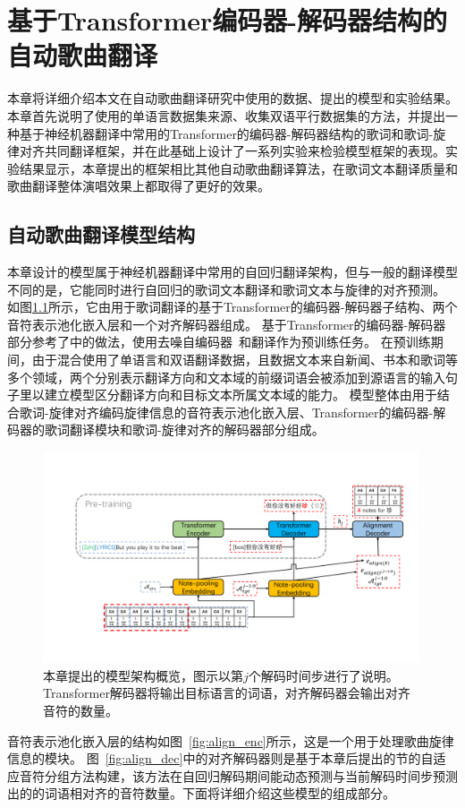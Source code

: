 \newcommand{\modelname}{LTAG}
\chapter{基于Transformer编码器-解码器结构的自动歌曲翻译}
\label{sec:ast}
本章将详细介绍本文在自动歌曲翻译研究中使用的数据、提出的模型和实验结果。本章首先说明了使用的单语言数据集来源、收集双语平行数据集的方法，并提出一种基于神经机器翻译中常用的Transformer的编码器-解码器结构的歌词和歌词-旋律对齐共同翻译框架，并在此基础上设计了一系列实验来检验模型框架的表现。实验结果显示，本章提出的框架相比其他自动歌曲翻译算法，在歌词文本翻译质量和歌曲翻译整体演唱效果上都取得了更好的效果。
\section{自动歌曲翻译模型结构}
本章设计的模型属于神经机器翻译中常用的自回归翻译架构，但与一般的翻译模型不同的是，它能同时进行自回归的歌词文本翻译和歌词文本与旋律的对齐预测。
如图\ref{fig:model}所示，它由用于歌词翻译的基于Transformer的编码器-解码器子结构、两个音符表示池化嵌入层和一个对齐解码器组成。
基于Transformer的编码器-解码器部分参考了\citet{gagast}中的做法，使用去噪自编码器~\citep{bart}和翻译作为预训练任务。
在预训练期间，由于混合使用了单语言和双语翻译数据，且数据文本来自新闻、书本和歌词等多个领域，两个分别表示翻译方向和文本域的前缀词语会被添加到源语言的输入句子里以建立模型区分翻译方向和目标文本所属文本域的能力。
模型整体由用于结合歌词-旋律对齐编码旋律信息的音符表示池化嵌入层、Transformer的编码器-解码器的歌词翻译模块和歌词-旋律对齐的解码器部分组成。
\begin{figure}[ht]
    \centering
    \includegraphics[width=0.99\textwidth]{figure/ast/pipeline.pdf}
    \caption{本章提出的模型架构概览，图示以第$j$个解码时间步进行了说明。Transformer解码器将输出目标语言的词语，对齐解码器会输出对齐音符的数量。}
    \label{fig:model}
\end{figure}
音符表示池化嵌入层的结构如图~\ref{fig:align_enc}所示，这是一个用于处理歌曲旋律信息的模块。
图~\ref{fig:align_dec}中的对齐解码器则是基于本章后提出的节的自适应音符分组方法构建，该方法在自回归解码期间能动态预测与当前解码时间步预测出的的词语相对齐的音符数量。下面将详细介绍这些模型的组成部分。
